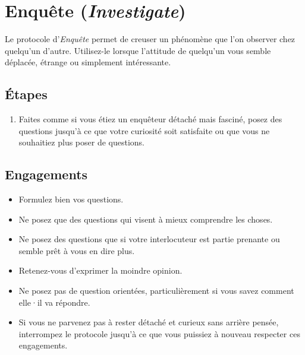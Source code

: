 \documentclass[11pt]{book}
\let\oldsection\section
\renewcommand\section{\clearpage\oldsection}
\begin{document}
\section{Enquête (\emph{Investigate})} \label{protocole-enquete}

Le protocole d'\emph{Enquête} permet de creuser un phénomène que l'on observer chez quelqu'un d'autre. Utilisez-le lorsque l'attitude de quelqu'un vous 
semble déplacée, étrange ou simplement intéressante. 

\subsection{Étapes}
\begin{enumerate}
	\item Faites comme si vous étiez un enquêteur détaché mais fasciné, posez des questions jusqu'à ce que votre curiosité soit satisfaite ou que vous
	      ne souhaitiez plus poser de questions.
\end{enumerate}

\subsection{Engagements}
\begin{itemize}
	\item Formulez bien vos questions.
	\item Ne posez que des questions qui visent à mieux comprendre les choses.
	\item Ne posez des questions que si votre interlocuteur est partie prenante ou semble prêt à vous en dire plus.
	\item Retenez-vous d'exprimer la moindre opinion.
	\item Ne posez pas de question orientées, particulièrement si vous savez comment elle·il va répondre. 
	\item Si vous ne parvenez pas à rester détaché et curieux sans arrière pensée, interrompez le protocole jusqu'à ce que vous puissiez à nouveau 
	      respecter ces engagements.
\end{itemize}
\end{document}
